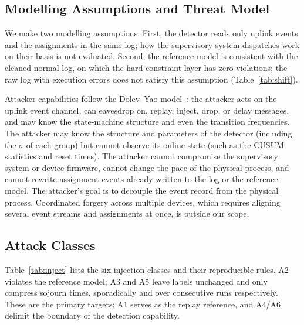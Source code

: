 \documentclass[manuscript,screen,review]{acmart}
\begin{document}
\subsection{Modelling Assumptions and Threat Model}
\label{sec:assumptions}

We make two modelling assumptions. First, the detector reads only uplink events and the assignments in the same log; how the supervisory system dispatches work on their basis is not evaluated. Second, the reference model is consistent with the cleaned normal log, on which the hard-constraint layer has zero violations; the raw log with execution errors does not satisfy this assumption (Table~\ref{tab:shift}).

Attacker capabilities follow the {Dolev--Yao} model~\cite{dolev1983yao}: the attacker acts on the uplink event channel, can eavesdrop on, replay, inject, drop, or delay messages, and may know the state-machine structure and even the transition frequencies. The attacker may know the structure and parameters of the detector (including the $\sigma$ of each group) but cannot observe its online state (such as the {CUSUM} statistics and reset times). The attacker cannot compromise the supervisory system or device firmware, cannot change the pace of the physical process, and cannot rewrite assignment events already written to the log or the reference model. The attacker's goal is to decouple the event record from the physical process. Coordinated forgery across multiple devices, which requires aligning several event streams and assignments at once, is outside our scope.

\subsection{Attack Classes}
\label{sec:coverage}

Table~\ref{tab:inject} lists the six injection classes and their reproducible rules. {A2} violates the reference model; {A3} and {A5} leave labels unchanged and only compress sojourn times, sporadically and over consecutive runs respectively. These are the primary targets; {A1} serves as the replay reference, and {A4}/{A6} delimit the boundary of the detection capability.
\end{document}
